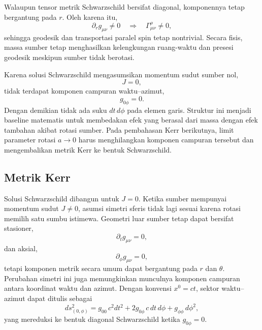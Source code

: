 Walaupun tensor metrik Schwarzschild bersifat diagonal, komponennya tetap
bergantung pada $r$. Oleh karena itu,
\begin{equation}
    \partial_r g_{\mu\nu}\neq0
    \quad\Longrightarrow\quad
    \Gamma^\rho_{\mu\nu}\neq0,
\end{equation}
sehingga geodesik dan transportasi paralel spin tetap nontrivial. Secara
fisis, massa sumber tetap menghasilkan kelengkungan ruang-waktu dan presesi
geodesik meskipun sumber tidak berotasi.

Karena solusi Schwarzschild mengasumsikan momentum sudut sumber nol,
\begin{equation}
    J=0,
\end{equation}
tidak terdapat komponen campuran waktu--azimut,
\begin{equation}
    g_{0\phi}=0.
\end{equation}
Dengan demikian tidak ada suku $dt\,d\phi$ pada elemen garis. Struktur ini
menjadi baseline matematis untuk membedakan efek yang berasal dari massa
dengan efek tambahan akibat rotasi sumber. Pada pembahasan Kerr berikutnya,
limit parameter rotasi $a\rightarrow0$ harus menghilangkan komponen campuran
tersebut dan mengembalikan metrik Kerr ke bentuk Schwarzschild.


\subsection{Metrik Kerr}
\label{subsec:metrik-kerr}

Solusi Schwarzschild dibangun untuk $J=0$. Ketika sumber mempunyai momentum
sudut $J\neq0$, asumsi simetri sferis tidak lagi sesuai karena rotasi memilih
satu sumbu istimewa. Geometri luar sumber tetap dapat bersifat stasioner,
\begin{equation}
    \partial_t g_{\mu\nu}=0,
\end{equation}
dan aksial,
\begin{equation}
    \partial_\phi g_{\mu\nu}=0,
\end{equation}
tetapi komponen metrik secara umum dapat bergantung pada $r$ dan $\theta$.
Perubahan simetri ini juga memungkinkan munculnya komponen campuran antara
koordinat waktu dan azimut. Dengan konvensi $x^0=ct$, sektor waktu--azimut
dapat ditulis sebagai
\begin{equation}
    ds^2_{(0,\phi)}
    =g_{00}\,c^2dt^2
    +2g_{0\phi}\,c\,dt\,d\phi
    +g_{\phi\phi}\,d\phi^2,
    \label{eq:stationary-axisymmetric-sector}
\end{equation}
yang mereduksi ke bentuk diagonal Schwarzschild ketika $g_{0\phi}=0$.

